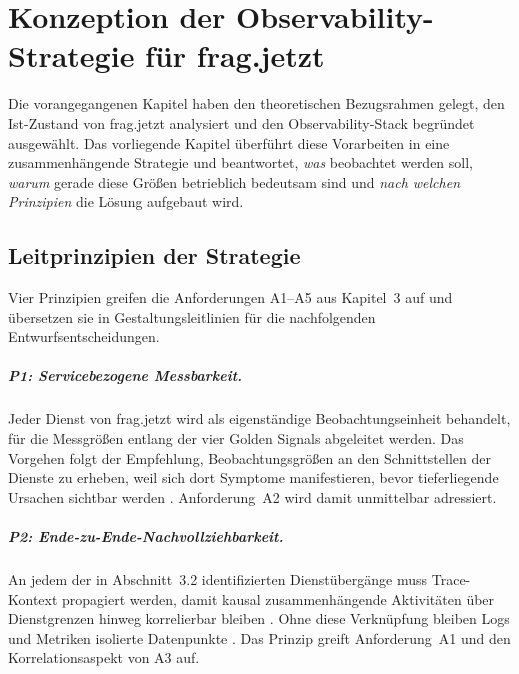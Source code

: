  
 
\chapter{Konzeption der Observability-Strategie für frag.jetzt}
 
Die vorangegangenen Kapitel haben den theoretischen Bezugsrahmen gelegt, den Ist-Zustand von frag.jetzt analysiert und den Observability-Stack begründet ausgewählt. Das vorliegende Kapitel überführt diese Vorarbeiten in eine zusammenhängende Strategie und beantwortet, \emph{was} beobachtet werden soll, \emph{warum} gerade diese Größen betrieblich bedeutsam sind und \emph{nach welchen Prinzipien} die Lösung aufgebaut wird.
 
 
\section{Leitprinzipien der Strategie}
\label{sec:leitprinzipien}
 
Vier Prinzipien greifen die Anforderungen A1--A5 aus Kapitel~3 auf und übersetzen sie in Gestaltungsleitlinien für die nachfolgenden Entwurfsentscheidungen.
 
\paragraph{P1: Servicebezogene Messbarkeit.}
Jeder Dienst von frag.jetzt wird als eigenständige Beobachtungseinheit behandelt, für die Messgrößen entlang der vier Golden Signals abgeleitet werden. Das Vorgehen folgt der Empfehlung, Beobachtungsgrößen an den Schnittstellen der Dienste zu erheben, weil sich dort Symptome manifestieren, bevor tieferliegende Ursachen sichtbar werden \parencite[S.~59]{ewaschukMonitoringDistributedSystems}. Anforderung~A2 wird damit unmittelbar adressiert.
 
\paragraph{P2: Ende-zu-Ende-Nachvollziehbarkeit.}
An jedem der in Abschnitt~3.2 identifizierten Dienstübergänge muss Trace-Kontext propagiert werden, damit kausal zusammenhängende Aktivitäten über Dienstgrenzen hinweg korrelierbar bleiben \parencite[S.~32]{bissig2024unified}. Ohne diese Verknüpfung bleiben Logs und Metriken isolierte Datenpunkte \parencite[S.~14--15]{sundstrom2025finding}. Das Prinzip greift Anforderung~A1 und den Korrelationsaspekt von A3 auf.
 
